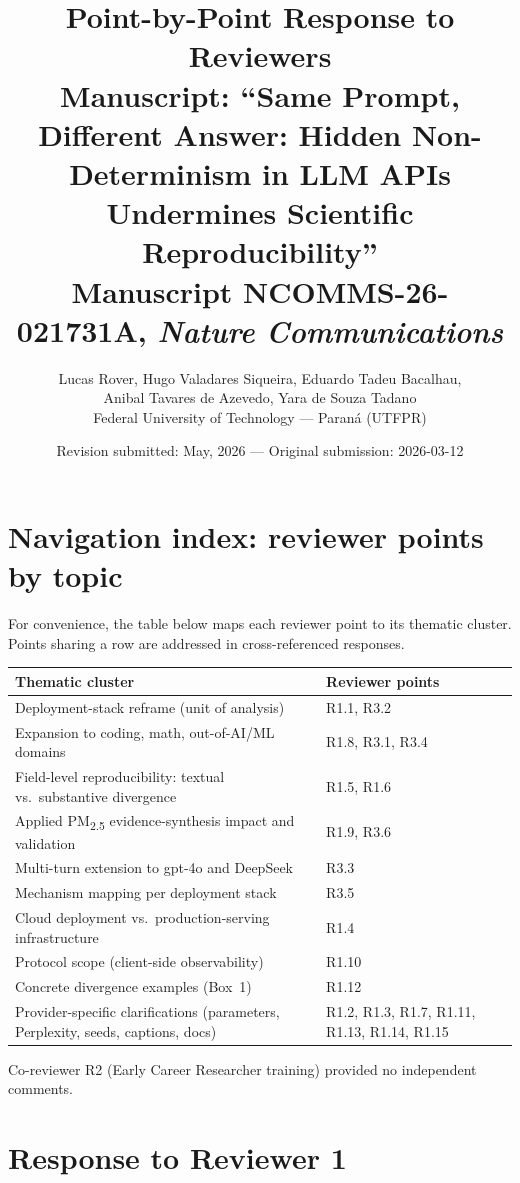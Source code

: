 \documentclass[11pt,a4paper]{article}
\title{\textbf{Point-by-Point Response to Reviewers} \\
\large Manuscript: ``Same Prompt, Different Answer: Hidden Non-Determinism in LLM APIs Undermines Scientific Reproducibility'' \\
\large Manuscript NCOMMS-26-021731A, \emph{Nature Communications}}
\author{Lucas Rover, Hugo Valadares Siqueira, Eduardo Tadeu Bacalhau, \\
Anibal Tavares de Azevedo, Yara de Souza Tadano \\
Federal University of Technology --- Paraná (UTFPR)}
\date{Revision submitted: May, 2026 --- Original submission: 2026-03-12}
\begin{document}
\maketitle

\section*{Navigation index: reviewer points by topic}

\noindent For convenience, the table below maps each reviewer point to its thematic cluster. Points sharing a row are addressed in cross-referenced responses.

\begin{center}
\renewcommand{\arraystretch}{1.25}
\begin{tabular}{p{6.5cm}p{8.5cm}}
\hline
\textbf{Thematic cluster} & \textbf{Reviewer points} \\
\hline
Deployment-stack reframe (unit of analysis) & R1.1, R3.2 \\
Expansion to coding, math, out-of-AI/ML domains & R1.8, R3.1, R3.4 \\
Field-level reproducibility: textual vs.\ substantive divergence & R1.5, R1.6 \\
Applied PM\textsubscript{2.5} evidence-synthesis impact and validation & R1.9, R3.6 \\
Multi-turn extension to gpt-4o and DeepSeek & R3.3 \\
Mechanism mapping per deployment stack & R3.5 \\
Cloud deployment vs.\ production-serving infrastructure & R1.4 \\
Protocol scope (client-side observability) & R1.10 \\
Concrete divergence examples (Box~1) & R1.12 \\
Provider-specific clarifications (parameters, Perplexity, seeds, captions, docs) & R1.2, R1.3, R1.7, R1.11, R1.13, R1.14, R1.15 \\
\hline
\end{tabular}
\end{center}

\noindent Co-reviewer R2 (Early Career Researcher training) provided no independent comments.

\newpage
\section*{Response to Reviewer 1}
\end{document}

